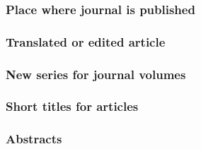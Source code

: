 \documentclass[11pt,letterpaper,oneside]{article}
\begin{document}
\setcounter{subsubsection}{181}
\subsubsection{Place where journal is published}

\begin{citebib}
\item \cite[65--70]{luu1999}
\item \cite{garrett1975}
\end{citebib}

\subsubsection{Translated or edited article}

\begin{citebib}
\item \cite{authorb}
\item \cite{authorc}
\end{citebib}

\subsubsection{New series for journal volumes}
\label{14.184}

\begin{citebib}
\item \cite[414]{sewall1896}
\item \cite{moraes1950}
\end{citebib}

\subsubsection{Short titles for articles}

\begin{citebib}
\item \cite[223]{rosenblum2015}
\item \cite[225]{rosenblum2015}
\end{citebib}

\subsubsection{Abstracts}

\begin{citebib}
\item \cite{matute2015}
\end{citebib}
\end{document}
